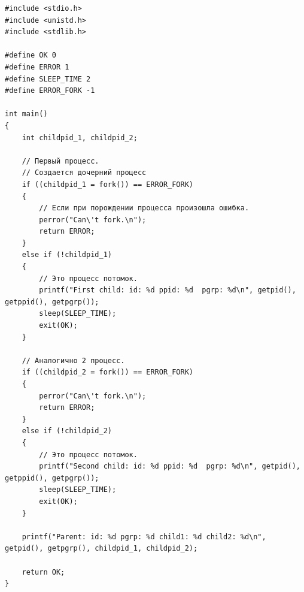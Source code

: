


\begin{lstlisting}[label=some-code,caption=Программа 1.]
#include <stdio.h>
#include <unistd.h>
#include <stdlib.h>

#define OK 0
#define ERROR 1
#define SLEEP_TIME 2
#define ERROR_FORK -1

int main()
{
	int childpid_1, childpid_2;

	// Первый процесс.
	// Создается дочерний процесс
	if ((childpid_1 = fork()) == ERROR_FORK)
	{
		// Если при порождении процесса произошла ошибка.
		perror("Can\'t fork.\n");
		return ERROR;
	}
	else if (!childpid_1)
	{
		// Это процесс потомок.
		printf("First child: id: %d ppid: %d  pgrp: %d\n", getpid(), getppid(), getpgrp());
		sleep(SLEEP_TIME);
		exit(OK);
	}

	// Аналогично 2 процесс.
	if ((childpid_2 = fork()) == ERROR_FORK)
	{
		perror("Can\'t fork.\n");
		return ERROR;
	}
	else if (!childpid_2)
	{
		// Это процесс потомок.
		printf("Second child: id: %d ppid: %d  pgrp: %d\n", getpid(), getppid(), getpgrp());
		sleep(SLEEP_TIME);
		exit(OK);
	}

	printf("Parent: id: %d pgrp: %d child1: %d child2: %d\n", getpid(), getpgrp(), childpid_1, childpid_2);

	return OK;
}
\end{lstlisting}

\begin{figure}[ht!]
\end{figure}

\begin{figure}[ht!]
\end{figure}

